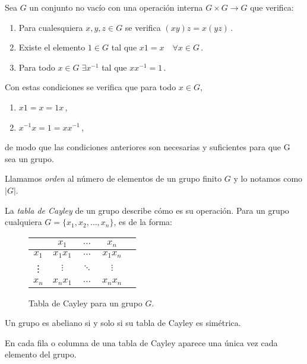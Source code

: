 \begin{nprop}
Sea $G$ un conjunto no vacío con una operación interna $G \times G \to G$ que verifica:
\begin{enumerate}
  \item Para cualesquiera $x,y,z \in G$ se verifica $(xy)z = x(yz)$\,.
  \item Existe el elemento $1 \in G$ tal que $x1 = x \quad \forall x \in G$\,.
  \item Para todo $x \in G \; \exists x^{-1}$ tal que $xx^{-1} = 1$\,.
\end{enumerate}
Con estas condiciones se verifica que para todo $x \in G$,
\begin{enumerate}
  \item $x1 = x = 1x$\,,
  \item $x^{-1}x = 1 = xx^{-1}$\,,
\end{enumerate}
de modo que las condiciones anteriores son necesarias y suficientes para que G sea un grupo.
\end{nprop}

\begin{ndef}
Llamamos \textit{orden} al número de elementos de un grupo finito $G$ y lo notamos como $|G|$.
\end{ndef}

La \textit{tabla de Cayley} de un grupo describe cómo es su operación. Para un grupo cualquiera $G = \{x_1,x_2,\hdots,x_n\}$, es de la forma:

\begin{figure}[H]
\centering
  \begin{tabular}{c|cccc}
     & \textbf{$x_1$} & $\hdots$ & \textbf{$x_n$} \\
    \hline
    \textbf{$x_1$} & $x_1 x_1$ & $\hdots$ & $x_1 x_n$\\
    \vdots & $\vdots$ & $\ddots$ & $\vdots$ \\
    \textbf{$x_n$} & $x_n x_1$ & $\hdots$ & $x_n x_n$\\
  \end{tabular}
  \caption{Tabla de Cayley para un grupo $G$.}
\end{figure}


\begin{ncor}
  Un grupo es abeliano si y solo si su tabla de Cayley es simétrica.
\end{ncor}

\begin{ncor}
   En cada fila o columna de una tabla de Cayley aparece una única vez cada elemento del grupo.
\end{ncor}


